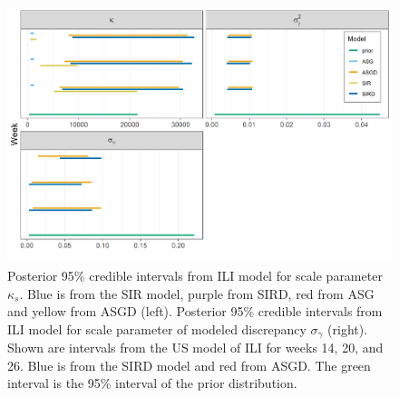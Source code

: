 \documentclass[ba]{imsart}
\theoremstyle{plain}
\theoremstyle{definition}
\theoremstyle{remark}
\begin{document}
\begin{supplement}
\begin{figure}[hbt!]
\centering
  \centering
  \includegraphics[width=.95\linewidth]{Images/posterior_comb.png}
\caption{Posterior 95\% credible intervals from ILI model for scale 
parameter $\kappa_s$. 
Blue is from the SIR model, purple from SIRD, 
red from ASG and yellow from ASGD (left).  
Posterior 95\% credible intervals from ILI model for scale parameter of 
modeled discrepancy $\sigma_{\gamma}$ (right). Shown are intervals from the 
US model of ILI for weeks 14, 20, and 26. Blue is from the SIRD model and red 
from ASGD. The green interval is the 95\% interval of the prior distribution.}
\label{fig:sir_asg_shared}
\end{figure}









\end{supplement}
\end{document}
